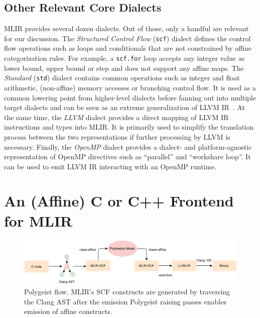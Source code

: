 \documentclass[sigplan]{acmart}
\newcommand{\icode}[1]{{\texttt {#1}}}
\newcommand{\tool}{Polygeist\xspace}
\newcommand{\memref}{\icode{memref}\xspace}
\begin{document}

\subsection{Other Relevant Core Dialects}
MLIR  provides several dozen dialects.
Out of those, only a handful are relevant for our discussion.
The \emph{Structured Control Flow} (\icode{scf}) dialect defines the control flow operations such as loops and conditionals that are not constrained by affine categorization rules.
For example, a \icode{scf.for} loop accepts any integer value as lower bound, upper bound or step and does not support any affine maps.
The \emph{Standard} (\icode{std}) dialect contains common operations such as integer and float arithmetic, (non-affine) memory accesses or branching control flow.
It is used as a common lowering point from higher-level dialects before fanning out into multiple target dialects and can be seen as an extreme generalization of LLVM IR~\cite{llvm}.
At the same time, the \emph{LLVM} dialect provides a direct mapping of LLVM IR instructions and types into MLIR.
It is primarily used to simplify the translation process between the two representations if further processing by LLVM is necessary.
Finally, the \emph{OpenMP} dialect provides a dialect- and platform-agnostic representation of OpenMP directives such as ``parallel'' and ``workshare loop''. It can be used to emit LLVM IR interacting with an OpenMP runtime.

\section{An (Affine) C or C++ Frontend for MLIR}

\begin{figure}
\begin{center}
\includegraphics[scale=0.75]{images/pipeline.pdf}
\vspace{-.3cm}
\caption{\tool flow. MLIR's SCF constructs are generated by traversing the Clang AST after the emission \tool raising passes enables emission of affine constructs.}
\label{fig:pipeline}
\end{center}
\end{figure}
\end{document}
